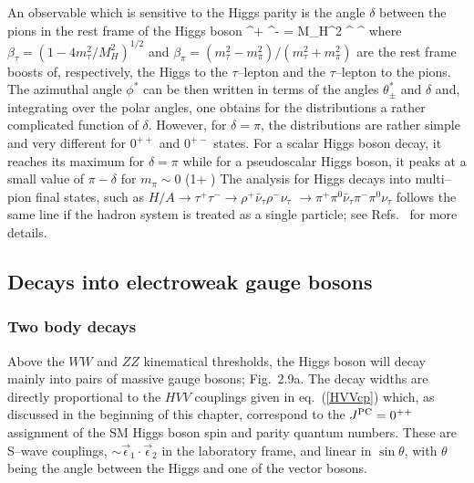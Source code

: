 An observable which is sensitive to the Higgs parity is the angle $\delta$ 
between the pions in the rest frame of the Higgs boson 
\cite{CPHff1,Kuhn-Wagner,CPHff4,CPHff3}
 \vec{\pi}^+ \cdot \vec{\pi}^- =  M_H^2 ^{}
^{} \cos \delta
\eeq
where $\beta_\tau = (1- 4m_\tau^2/M_H^2)^{1/2}$ and $\beta_\pi = (m_\tau^2
-m_\pi^2)/(m_\tau^2+m_\pi^2)$ are the rest frame boosts of, respectively, 
the Higgs to the $\tau$--lepton and the $\tau$--lepton to the pions. The 
azimuthal angle $\phi^*$ can be then written in terms of the angles 
$\theta_\pm^*$ and $\delta$ and, integrating over the polar angles, one obtains 
for the distributions a rather complicated function of $\delta$. However, 
for $\delta=\pi$, the distributions  are rather simple and very different for 
$0^{++}$ and $0^{+-}$ states. For a scalar Higgs boson decay, it reaches its 
maximum for $\delta=\pi$ 
\beq
{}  \simeq {}  
\eeq
while for a pseudoscalar Higgs boson, it peaks at a small value of $\pi-\delta$
for $m_\pi \sim 0$ 
\beq
{}  \simeq (1+\cos 
\delta)   
\eeq
The analysis for Higgs decays into multi--pion final states, such as  $H/A \to
\tau^+ \tau^- \to \rho^+ \bar{\nu}_\tau \rho^- \nu_\tau $ $\to \pi^+  \pi^0
\bar{\nu}_\tau \pi^- \pi^0 \nu_\tau$  follows the same line if the hadron 
system is treated as a single particle; see Refs.~\cite{CPHff1,CPHff3} for 
more details.


\subsection{Decays into electroweak gauge bosons} 

\subsubsection{Two body decays}

Above the $WW$ and $ZZ$ kinematical thresholds, the Higgs boson will decay 
mainly into pairs of massive gauge bosons; Fig.~2.9a. The decay widths are 
directly proportional to the $HVV$ couplings given in eq.~(\ref{HVVcp}) which, 
as discussed in the beginning of this chapter, correspond to the $J^{\rm PC}=
0^{++}$ assignment of the SM Higgs boson spin and parity quantum numbers. These 
are S--wave couplings, $\sim \vec\epsilon_1\cdot\vec\epsilon_2$ in the 
laboratory frame, and linear in $\sin \theta$, with $\theta$ being the angle 
between the Higgs and one of the vector bosons.\s

